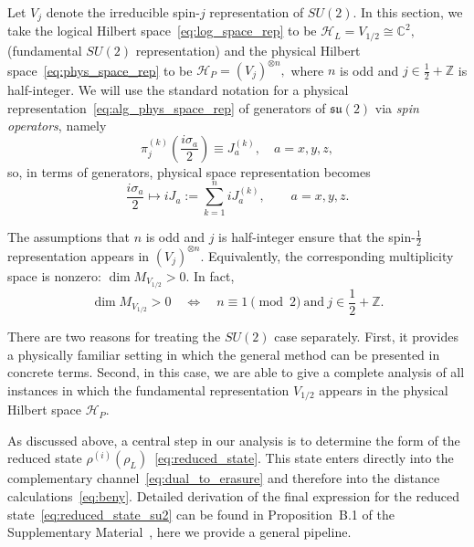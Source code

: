 \documentclass[10pt,twocolumn,superscriptaddress,aps,amsmath,amssymb,citeautoscript,floatfix,prx,longbibliography]{revtex4-2}
\newcounter{alg}
\theoremstyle{plain}
\theoremstyle{plain}
\theoremstyle{plain}
\theoremstyle{plain}
\theoremstyle{plain}
\theoremstyle{plain}
\begin{document}
Let \(V_j\) denote the irreducible spin-\(j\) representation of \(SU(2)\). 
In this section, we take the logical Hilbert space~\eqref{eq:log_space_rep} to be
$
    \mathcal H_L = V_{1/2}\cong \mathbb C^2,
$
(fundamental $SU(2)$ representation) and the physical Hilbert space~\eqref{eq:phys_space_rep} to be
$
    \mathcal H_P = (V_j)^{\otimes n},
$
where \(n\) is odd and \(j\in \frac12+\mathbb Z\) is half-integer. 
We will use the standard notation for a physical representation~\eqref{eq:alg_phys_space_rep} of generators of $\mathfrak{su}(2)$ via \textit{spin operators}, namely 
$$
\pi_j^{(k)}\left(\frac{i\sigma_a}{2}\right)\equiv J_a^{(k)}, \quad a=x,y,z, 
$$
so, in terms of generators, physical space representation becomes
\begin{equation}\label{eq:su2_cov_rep}
    \frac{i\sigma_a}{2}
    \longmapsto
    iJ_a
    :=
    \sum_{k=1}^n iJ_a^{(k)},
    \qquad
    a=x,y,z.
\end{equation}

The assumptions that \(n\) is odd and \(j\) is half-integer ensure that the spin-\(\frac12\) representation appears in \((V_j)^{\otimes n}\). Equivalently, the corresponding multiplicity space is nonzero:
$
    \dim M_{V_{1/2}}>0.
$
In fact,
\[
    \dim M_{V_{1/2}}>0
    \quad\Longleftrightarrow\quad
    n\equiv 1 \pmod 2
    \ \text{and}\
    j\in \frac12+\mathbb Z .
\]

There are two reasons for treating the $SU(2)$ case separately. First, it provides a physically familiar setting in which the general method can be presented in concrete terms. Second, in this case, we are able to give a complete analysis of all instances in which the fundamental representation $V_{1/2}$ appears in the physical Hilbert space $\mathcal{H}_P$.

As discussed above, a central step in our analysis is to determine the form of the reduced state
\(\rho^{(i)}(\rho_L)\)~\eqref{eq:reduced_state}. This state enters directly into the complementary channel~\eqref{eq:dual_to_erasure} and therefore into the distance calculations~\eqref{eq:beny}. Detailed derivation of the final expression for the reduced state~\eqref{eq:reduced_state_su2} can be found in Proposition~B.1 of the Supplementary Material~\cite{SuppMat}, here we provide a general pipeline.
\end{document}

